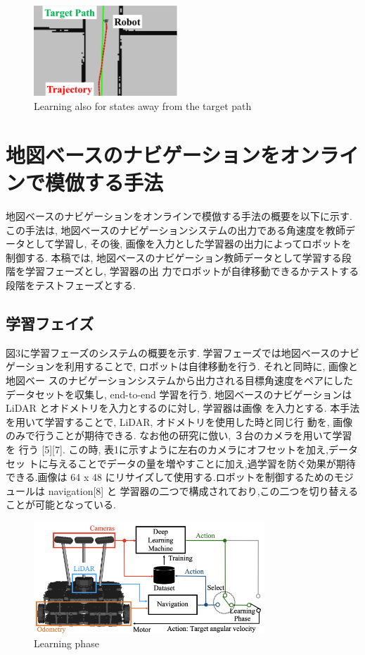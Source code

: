 \documentclass{jarticle}
\begin{document}
\begin{figure}[h!]
  \centering
   \includegraphics[height=34mm]{./figs/outof.png}
   \vspace*{-5mm}
   \caption{Learning also for states away from the target path}
\end{figure}

 
\section{地図ベースのナビゲーションをオンラインで模倣する手法}
地図ベースのナビゲーションをオンラインで模倣する手法の概要を以下に示す.
この手法は, 地図ベースのナビゲーションシステムの出力である角速度を教師データとして学習し, 
その後, 画像を入力とした学習器の出力によってロボットを制御する. 本稿では, 
地図ベースのナビゲーション教師データとして学習する段階を学習フェーズとし, 学習器の出
力でロボットが自律移動できるかテストする段階をテストフェーズとする.

\subsection{学習フェイズ}
図3に学習フェーズのシステムの概要を示す. 学習フェーズでは地図ベースのナビ
ゲーションを利用することで, ロボットは自律移動を行う. それと同時に, 画像と地図ベー
スのナビゲーションシステムから出力される目標角速度をペアにしたデータセットを収集し, 
end-to-end 学習を行う.
地図ベースのナビゲーションは LiDAR とオドメトリを入力とするのに対し, 学習器は画像
を入力とする. 本手法を用いて学習することで, LiDAR, オドメトリを使用した時と同じ行
動を, 画像のみで行うことが期待できる. なお他の研究に倣い, ３台のカメラを用いて学習を
行う [5][7]. この時, 表1に示すように左右のカメラにオフセットを加え,データセッ
トに与えることでデータの量を増やすことに加え,過学習を防ぐ効果が期待できる.画像は
64 x 48 にリサイズして使用する.ロボットを制御するためのモジュールは navigation[8] と
学習器の二つで構成されており,この二つを切り替えることが可能となっている.

\begin{figure}[h!]
  \centering
   \includegraphics[height=42mm]{./figs/learning.png}
   \vspace*{-4mm}
   \caption{Learning phase}
\end{figure}
\end{document}
